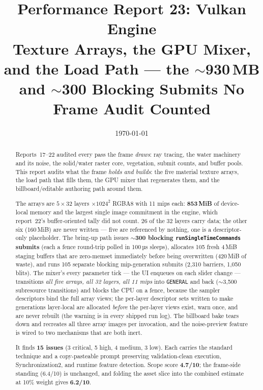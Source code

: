 \documentclass[11pt,a4paper]{article}
\title{Performance Report 23: Vulkan Engine \\
\large Texture Arrays, the GPU Mixer, and the Load Path --- the $\sim$930\,MB and $\sim$300 Blocking Submits No Frame Audit Counted}
\author{}
\date{\today}
\begin{document}
\maketitle

\begin{abstract}
Reports~17--22 audited every pass the frame \emph{draws}: ray tracing, the water
machinery and its noise, the solid/water raster core, vegetation, submit counts,
and buffer pools. This report audits what the frame \emph{holds and builds}: the
five material texture arrays, the load path that fills them, the GPU mixer that
regenerates them, and the billboard/editable authoring path around them.

The arrays are $5 \times 32$ layers $\times 1024^2$ RGBA8 with 11 mips each:
\textbf{853\,MiB} of device-local memory and the largest single image commitment
in the engine, which report~22's buffer-oriented tally did not count. 26 of the
32 layers carry data; the other six (160\,MiB) are never written --- five are
referenced by nothing, one is a descriptor-only placeholder. The bring-up path
issues \textbf{$\sim$300 blocking \texttt{runSingleTimeCommands} submits} (each a
fence round-trip polled in 100\,µs sleeps), allocates 105 fresh 4\,MiB staging
buffers that are zero-memset immediately before being overwritten (420\,MiB of
waste), and runs 105 separate blocking mip-generation submits (2{,}310 barriers,
1{,}050 blits). The mixer's every parameter tick --- the UI enqueues on each
slider change --- transitions \emph{all five arrays, all 32 layers, all 11 mips}
into \texttt{GENERAL} and back ($\sim$3{,}500 subresource transitions) and blocks
the CPU on a fence, because the sampler descriptors bind the full array views;
the per-layer descriptor sets written to make generations layer-local are
allocated \emph{before} the per-layer views exist, warn once, and are never
rebuilt (the warning is in every shipped run log). The billboard bake tears
down and recreates all three array images per invocation, and the noise-preview
feature is wired to two mechanisms that are both inert.

It finds \textbf{15 issues} (3 critical, 5 high, 4 medium, 3 low). Each carries
the standard technique and a copy-pasteable prompt preserving validation-clean
execution, Synchronization2, and runtime feature detection. Scope score
\textbf{4.7/10}; the frame-side standing (6.4/10) is unchanged, and folding the
asset slice into the combined estimate at 10\% weight gives \textbf{6.2/10}.
\end{abstract}
\end{document}
